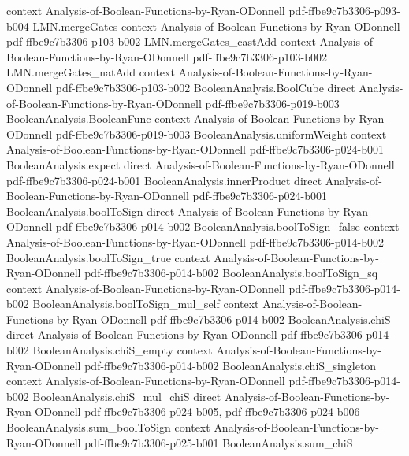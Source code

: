 \begin{lemma}
  {context}
  {Analysis-of-Boolean-Functions-by-Ryan-ODonnell}
  {pdf-ffbe9c7b3306-p093-b004}
\proofstep
  {LMN.mergeGates}
  {context}
  {Analysis-of-Boolean-Functions-by-Ryan-ODonnell}
  {pdf-ffbe9c7b3306-p103-b002}
\proofstep
  {LMN.mergeGates_castAdd}
  {context}
  {Analysis-of-Boolean-Functions-by-Ryan-ODonnell}
  {pdf-ffbe9c7b3306-p103-b002}
\proofstep
  {LMN.mergeGates_natAdd}
  {context}
  {Analysis-of-Boolean-Functions-by-Ryan-ODonnell}
  {pdf-ffbe9c7b3306-p103-b002}
\proofstep
  {BooleanAnalysis.BoolCube}
  {direct}
  {Analysis-of-Boolean-Functions-by-Ryan-ODonnell}
  {pdf-ffbe9c7b3306-p019-b003}
\proofstep
  {BooleanAnalysis.BooleanFunc}
  {context}
  {Analysis-of-Boolean-Functions-by-Ryan-ODonnell}
  {pdf-ffbe9c7b3306-p019-b003}
\proofstep
  {BooleanAnalysis.uniformWeight}
  {context}
  {Analysis-of-Boolean-Functions-by-Ryan-ODonnell}
  {pdf-ffbe9c7b3306-p024-b001}
\proofstep
  {BooleanAnalysis.expect}
  {direct}
  {Analysis-of-Boolean-Functions-by-Ryan-ODonnell}
  {pdf-ffbe9c7b3306-p024-b001}
\proofstep
  {BooleanAnalysis.innerProduct}
  {direct}
  {Analysis-of-Boolean-Functions-by-Ryan-ODonnell}
  {pdf-ffbe9c7b3306-p024-b001}
\proofstep
  {BooleanAnalysis.boolToSign}
  {direct}
  {Analysis-of-Boolean-Functions-by-Ryan-ODonnell}
  {pdf-ffbe9c7b3306-p014-b002}
\proofstep
  {BooleanAnalysis.boolToSign_false}
  {context}
  {Analysis-of-Boolean-Functions-by-Ryan-ODonnell}
  {pdf-ffbe9c7b3306-p014-b002}
\proofstep
  {BooleanAnalysis.boolToSign_true}
  {context}
  {Analysis-of-Boolean-Functions-by-Ryan-ODonnell}
  {pdf-ffbe9c7b3306-p014-b002}
\proofstep
  {BooleanAnalysis.boolToSign_sq}
  {context}
  {Analysis-of-Boolean-Functions-by-Ryan-ODonnell}
  {pdf-ffbe9c7b3306-p014-b002}
\proofstep
  {BooleanAnalysis.boolToSign_mul_self}
  {context}
  {Analysis-of-Boolean-Functions-by-Ryan-ODonnell}
  {pdf-ffbe9c7b3306-p014-b002}
\proofstep
  {BooleanAnalysis.chiS}
  {direct}
  {Analysis-of-Boolean-Functions-by-Ryan-ODonnell}
  {pdf-ffbe9c7b3306-p014-b002}
\proofstep
  {BooleanAnalysis.chiS_empty}
  {context}
  {Analysis-of-Boolean-Functions-by-Ryan-ODonnell}
  {pdf-ffbe9c7b3306-p014-b002}
\proofstep
  {BooleanAnalysis.chiS_singleton}
  {context}
  {Analysis-of-Boolean-Functions-by-Ryan-ODonnell}
  {pdf-ffbe9c7b3306-p014-b002}
\proofstep
  {BooleanAnalysis.chiS_mul_chiS}
  {direct}
  {Analysis-of-Boolean-Functions-by-Ryan-ODonnell}
  {pdf-ffbe9c7b3306-p024-b005,
    pdf-ffbe9c7b3306-p024-b006}
\proofstep
  {BooleanAnalysis.sum_boolToSign}
  {context}
  {Analysis-of-Boolean-Functions-by-Ryan-ODonnell}
  {pdf-ffbe9c7b3306-p025-b001}
\proofstep
  {BooleanAnalysis.sum_chiS}

\end{lemma}
